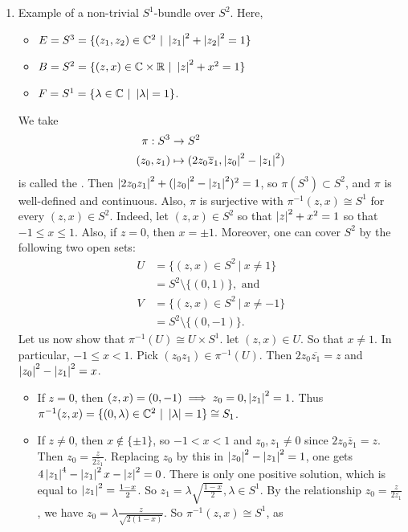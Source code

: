 \documentclass[main.tex]{subfiles}
\begin{document}
\begin{exmp}
\begin{enumerate}
    \item {} Example of a non-trivial $S^1$-bundle over $S^2$. Here,
    \begin{itemize}
        \item $E = S^3 = \{(z_1, z_2) \in \C^2 \ | \ \anorm{z_1}^2 + \anorm{z_2}^2= 1 \}$
        \item $B = S^2 = \{(z, x) \in \C \times \R \ | \ \anorm{z}^2 + x^2 = 1 \}$
        \item $F = S^1 = \{ \lambda \in \C \ | \ \anorm{\lambda} = 1 \}$.
    \end{itemize}
    We take
    \begin{align*}
        \pi : S^3 &\to S^2 \\
        (z_0, z_1) &\mapsto (2z_0\overline{z}_1, \left| z_0 \right|^2 - \left| z_1 \right|^2)
    \end{align*}
    is called the . Then $\left| 2z_0z_1 \right|^2 + (\left| z_0 \right|^2 - \left| z_1 \right|^2)^2 = 1$, so $\pi(S^3) \subset S^2$, and $\pi$ is well-defined and continuous. Also, $\pi$ is surjective with $\pi^{-1}(z, x) \cong S^1$ for every $(z, x) \in S^2$. Indeed, let $(z, x) \in S^2$ so that $\left| z \right|^2 + x^2 = 1$ so that $-1 \leq x \leq 1$. Also, if $z = 0$, then $x = \pm 1$. Moreover, one can cover $S^2$ by the following two open sets:
    \begin{align*}
        U &= \{ (z, x) \in S^2 \ | \ x \neq 1 \} \\
          &= S^2 \setminus \{(0, 1)\}, \text{ and } \\
        V &= \{ (z, x) \in S^2 \ | \ x \neq -1\} \\
          &= S^2 \setminus \{(0, -1)\}.
    \end{align*}
    Let us now show that $\pi^{-1}(U) \cong U \times S^1$. let $(z, x) \in U$. So that $x \neq 1$. In particular, $-1 \leq x < 1$. Pick $(z_0 z_1) \in \pi^{-1}(U)$. Then $2z_0\overline{z_1} = z$ and $\left| z_0 \right|^2 - \left| z_1 \right|^2 =x$.
    \begin{itemize}
        \item If $z = 0$, then $(z,x) = (0, -1) \implies z_0 = 0, \left| z_1 \right|^2 = 1$. Thus $\pi^{-1}(z,x) = \{ (0, \lambda) \in \mathbb{C}^2 \ | \ \left| \lambda \right| = 1  \} \cong S_1$.
        \item If $z \neq 0$, then $x \notin \{ \pm1\}$, so $-1 < x < 1$ and $z_0, z_1 \neq 0$ since $2z_0 \overline{z}_1 = z$. Then $z_0 = \frac{z}{2\overline{z}_1}$. Replacing $z_0$ by this in $\left| z_0 \right|^2 - \left| z_1 \right|^2 = 1$, one gets $4\left| z_1 \right|^4 - \left| z_1 \right|^2x - \left| z \right|^2 = 0$. There is only one positive solution, which is equal to $\left| z_1 \right|^2 = \frac{1-x}{2}$. So $z_1 = \lambda \sqrt{\frac{1-x}{2}}, \lambda \in S^1$.  By the relationship $z_0 = \frac{z}{2\overline{z_1}}$, we have $z_0 = \lambda \frac{z}{\sqrt{2(1-x)}}$. So $\pi^{-1}(z,x) \cong S^1$, as

\end{itemize}
\end{enumerate}
\end{exmp}
\end{document}
